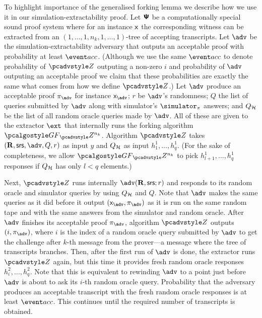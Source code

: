 \documentclass[runningheads,11pt]{llncs}
\theoremstyle{definition} \newtheorem{definition}[theorem]{Definition}
\begin{document}
To highlight importance of the generalised forking lemma we describe how we use
it in our simulation-extractability proof.  Let $\bm{\mathsf{\Psi}}$ be a
computationally special sound proof system where for an instance $\mathsf{x}$ the
corresponding witness can be extracted from an
$(1, \ldots, 1, n_k, 1, \ldots, 1)$-tree of accepting transcripts.  Let $\advse$
be the simulation-extractability adversary that outputs an acceptable proof with
probability at least $\accProb$. (Although we use the same $\accProb$ to denote
probability of $\zdv$ outputing a non-zero $i$ and probability of $\advse$
outputing an acceptable proof we claim that these probabilities are exactly the
same what comes from how we define $\zdv$.)  Let $\advse$ produce an acceptable
proof $\zkproof_{\advse}$ for instance $\inp_{\advse}$; $r$ be $\advse$'s
randomness; $Q$ the list of queries submitted by $\advse$ along with simulator's
$\simulator_\zkproof$ answers; and $Q_{\mathcal{H}}$ be the list of all random oracle
queries made by $\advse$.  All of these are given to the extractor $\ext$ that
internally runs the forking algorithm $\genforking_\zdv^{n_k}$.  Algorithm $\zdv$
takes $(\REL, \srs, \advse,
Q, r)$ as input $y$ and $Q_{\mathcal{H}}$ as input $h_1^1, \ldots,
h_q^1$. 
(For the sake of completeness, we allow $\genforking_\zdv^{n_k}$ to
pick $h^1_{l + 1}, \ldots, h^1_q$ responses if $Q_{\mathcal{H}}$ has only $l < q$
elements.)  

Next, $\zdv$ runs internally $\advse(\REL, \srs; r)$ and responds to its random
oracle and simulator queries by using $Q_{\mathcal{H}}$ and $Q$. Note that $\advse$ makes
the same queries as it did before it output $(\inp_{\advse}, \zkproof_{\advse})$
as it is run on the same random tape and with the same answers from the
simulator and random oracle. After $\advse$ finishes its acceptable proof
$\zkproof_{\advse}$, algorithm $\zdv$ outputs $(i, \zkproof_{\advse})$, where
$i$ is the index of a random oracle query submitted by $\advse$ to get the challenge after
$k$-th message from the prover---a message where the tree of transcripts
branches.
Then, after the first run of $\advse$ is done, the extractor runs $\zdv$ again,
but this time it provides fresh random oracle responses $h^2_i, \ldots,
h^2_q$. Note that this is equivalent to rewinding $\advse$ to a point just
before $\advse$ is about to ask its $i$-th random oracle
query. Probability that the adversary produces an acceptable transcript with the
fresh random oracle responses is at least $\accProb$. This continues until the
required number of transcripts is obtained. 
\end{document}
